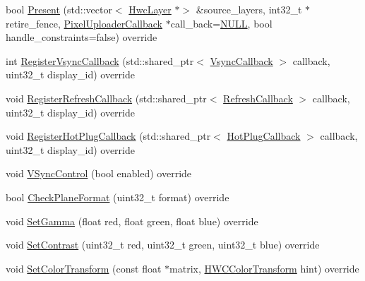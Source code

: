 \begin{DoxyCompactItemize}
\item 
bool \mbox{\hyperlink{classhwcomposer_1_1PhysicalDisplay_aafc7fc562c026ce24ac7900c12023bd8}{Present}} (std\+::vector$<$ \mbox{\hyperlink{structhwcomposer_1_1HwcLayer}{Hwc\+Layer}} $\ast$$>$ \&source\+\_\+layers, int32\+\_\+t $\ast$retire\+\_\+fence, \mbox{\hyperlink{classhwcomposer_1_1PixelUploaderCallback}{Pixel\+Uploader\+Callback}} $\ast$call\+\_\+back=\mbox{\hyperlink{alios_2platformdefines_8h_a070d2ce7b6bb7e5c05602aa8c308d0c4}{N\+U\+LL}}, bool handle\+\_\+constraints=false) override
\item 
int \mbox{\hyperlink{classhwcomposer_1_1PhysicalDisplay_ac003447bfca005292fc052d5b573869e}{Register\+Vsync\+Callback}} (std\+::shared\+\_\+ptr$<$ \mbox{\hyperlink{classhwcomposer_1_1VsyncCallback}{Vsync\+Callback}} $>$ callback, uint32\+\_\+t display\+\_\+id) override
\item 
void \mbox{\hyperlink{classhwcomposer_1_1PhysicalDisplay_aaa21f6de6805e8e6d0d5771c3207cfd6}{Register\+Refresh\+Callback}} (std\+::shared\+\_\+ptr$<$ \mbox{\hyperlink{classhwcomposer_1_1RefreshCallback}{Refresh\+Callback}} $>$ callback, uint32\+\_\+t display\+\_\+id) override
\item 
void \mbox{\hyperlink{classhwcomposer_1_1PhysicalDisplay_ac56013d7b3323ca84594779358aeb254}{Register\+Hot\+Plug\+Callback}} (std\+::shared\+\_\+ptr$<$ \mbox{\hyperlink{classhwcomposer_1_1HotPlugCallback}{Hot\+Plug\+Callback}} $>$ callback, uint32\+\_\+t display\+\_\+id) override
\item 
void \mbox{\hyperlink{classhwcomposer_1_1PhysicalDisplay_a058a5c3a853da43fb76b129cc4e24ef8}{V\+Sync\+Control}} (bool enabled) override
\item 
bool \mbox{\hyperlink{classhwcomposer_1_1PhysicalDisplay_ad4986df79c02c4c30e205065028cc050}{Check\+Plane\+Format}} (uint32\+\_\+t format) override
\item 
void \mbox{\hyperlink{classhwcomposer_1_1PhysicalDisplay_a48f186ada1686b22a91a888482b8c915}{Set\+Gamma}} (float red, float green, float blue) override
\item 
void \mbox{\hyperlink{classhwcomposer_1_1PhysicalDisplay_af88a8e27861d615a2356fb749c3e0c7c}{Set\+Contrast}} (uint32\+\_\+t red, uint32\+\_\+t green, uint32\+\_\+t blue) override
\item 
void \mbox{\hyperlink{classhwcomposer_1_1PhysicalDisplay_aa6a598f275a6b67ba5c256ee0d830b59}{Set\+Color\+Transform}} (const float $\ast$matrix, \mbox{\hyperlink{hwcdefs_8h_a1a2c55aec4fbd12a1e323f2bdb3e9b88}{H\+W\+C\+Color\+Transform}} hint) override
$$
\end{DoxyCompactItemize}
